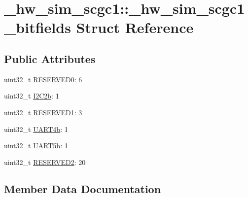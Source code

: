 \hypertarget{struct__hw__sim__scgc1_1_1__hw__sim__scgc1__bitfields}{}\section{\+\_\+hw\+\_\+sim\+\_\+scgc1\+:\+:\+\_\+hw\+\_\+sim\+\_\+scgc1\+\_\+bitfields Struct Reference}
\label{struct__hw__sim__scgc1_1_1__hw__sim__scgc1__bitfields}
\subsection*{Public Attributes}
\begin{DoxyCompactItemize}
\item 
uint32\+\_\+t \hyperlink{struct__hw__sim__scgc1_1_1__hw__sim__scgc1__bitfields_ab0e27d0ca2bff437576854bacb9699b5}{R\+E\+S\+E\+R\+V\+E\+D0}\+: 6
\item 
uint32\+\_\+t \hyperlink{struct__hw__sim__scgc1_1_1__hw__sim__scgc1__bitfields_a922fd78a2d5eaec0ee9336ed4c041342}{I2\+C2b}\+: 1
\item 
uint32\+\_\+t \hyperlink{struct__hw__sim__scgc1_1_1__hw__sim__scgc1__bitfields_ada13234a5c895b0fc9f1c14ec4a9528d}{R\+E\+S\+E\+R\+V\+E\+D1}\+: 3
\item 
uint32\+\_\+t \hyperlink{struct__hw__sim__scgc1_1_1__hw__sim__scgc1__bitfields_a9e8886908f3cbbec790d2d30a3c7f483}{U\+A\+R\+T4b}\+: 1
\item 
uint32\+\_\+t \hyperlink{struct__hw__sim__scgc1_1_1__hw__sim__scgc1__bitfields_a62d895087116926a7cd1b840c9d33cb1}{U\+A\+R\+T5b}\+: 1
\item 
uint32\+\_\+t \hyperlink{struct__hw__sim__scgc1_1_1__hw__sim__scgc1__bitfields_a79e36c0dff65f8ccf43d8cb827d3e637}{R\+E\+S\+E\+R\+V\+E\+D2}\+: 20
\end{DoxyCompactItemize}


\subsection{Member Data Documentation}
